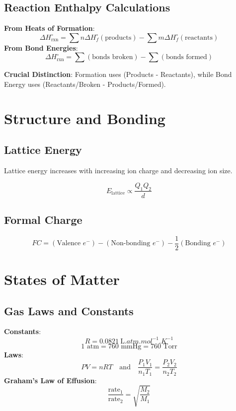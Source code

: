 \documentclass[11pt]{article}
\begin{document}
\subsection{Reaction Enthalpy Calculations}
\begin{tcolorbox}[memorize, title=Enthalpy Calculations (Must Memorize)]
    \textbf{From Heats of Formation}:
    \[ \Delta H_{\text{rxn}}^\circ = \sum n\Delta H_f^\circ(\text{products}) - \sum m\Delta H_f^\circ(\text{reactants}) \]
    \vspace{0.2em}
    \textbf{From Bond Energies}:
    \[ \Delta H_{\text{rxn}}^\circ = \sum (\text{bonds broken}) - \sum (\text{bonds formed}) \]
\end{tcolorbox}
\textbf{Crucial Distinction}: Formation uses (Products - Reactants), while Bond Energy uses (Reactants/Broken - Products/Formed).

\newpage

\section{Structure and Bonding}

\subsection{Lattice Energy}
Lattice energy increases with increasing ion charge and decreasing ion size.
\begin{tcolorbox}[memorize, title=Coulomb's Law (Must Memorize)]
    \[ E_{\text{lattice}} \propto \frac{Q_1 Q_2}{d} \]
\end{tcolorbox}

\subsection{Formal Charge}
\begin{tcolorbox}[memorize, title=Formal Charge (Must Memorize)]
    \[ FC = (\text{Valence } e^-) - (\text{Non-bonding } e^-) - \frac{1}{2}(\text{Bonding } e^-) \]
\end{tcolorbox}

\newpage

\section{States of Matter}

\subsection{Gas Laws and Constants}
\begin{tcolorbox}[provided, title=Gas Laws and Constants (Provided)]
    \textbf{Constants}:
    \[ R = \SI{0.0821}{\liter.atm.mol^{-1}.K^{-1}} \]
    \[ 1 \text{ atm} = 760 \text{ mmHg} = 760 \text{ Torr} \]
    \vspace{0.5em}
    \textbf{Laws}:
    \[ PV = nRT \quad \text{and} \quad \frac{P_1V_1}{n_1T_1} = \frac{P_2V_2}{n_2T_2} \]
    \vspace{0.5em}
    \textbf{Graham's Law of Effusion}:
    \[ \frac{\text{rate}_1}{\text{rate}_2} = \sqrt{\frac{M_2}{M_1}} \]
\end{tcolorbox}
\end{document}
